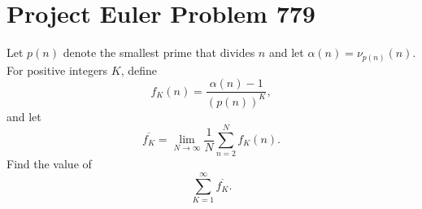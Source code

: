 \documentclass[a4paper, 12pt]{article}
\begin{document}
\section*{Project Euler Problem 779}

\begin{sidebox}
    \begin{problem}
        Let \( p(n) \) denote the smallest prime that divides \( n \) and let \( \alpha (n) = \nu_{p(n)}(n) \). For positive integers \( K \), define
        \[
            f_K(n) = \frac{\alpha(n) - 1}{(p(n))^K}
        ,\]
        and let
        \[
            \overline{f_K} = \lim_{N \to \infty} \frac{1}{N} \sum_{n = 2}^{N} f_K (n)
        .\]
        Find the value of
        \[
            \sum_{K = 1}^{\infty} \overline{f_K}
        .\]
    \end{problem}
\end{sidebox}
\end{document}
